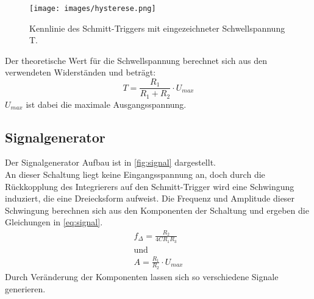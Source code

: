 \begin{figure}[H]
    \centering
    \texttt{[image: images/hysterese.png]}
    \caption{Kennlinie des Schmitt-Triggers mit eingezeichneter Schwellspannung T.\cite{schmitt}}
    \label{fig:hysterese}
\end{figure}

Der theoretische Wert für die Schwellspannung berechnet sich aus den verwendeten Widerständen und beträgt:
\begin{equation}
    T = \frac{R_1}{R_1 + R_2}\cdot U_{max}
    \label{eq:schmitt}
\end{equation}
$U_{max}$ ist dabei die maximale Ausgangsspannung.

\subsection{Signalgenerator}
Der Signalgenerator Aufbau ist in \autoref{fig:signal} dargestellt.\\
An dieser Schaltung liegt keine Eingangsspannung an, doch durch die Rückkopplung des Integrierers auf den Schmitt-Trigger wird eine Schwingung induziert, die eine Dreiecksform aufweist.
Die Frequenz und Amplitude dieser Schwingung berechnen sich aus den Komponenten der Schaltung und ergeben die Gleichungen in \ref{eq:signal}.
\begin{equation}
    \begin{aligned}
        f_{\Delta} = \frac{R_2}{4CR_1R_3}\\
        \text{und}\\
        A = \frac{R_1}{R_2}\cdot U_{max}
    \end{aligned}
    \label{eq:signal}
\end{equation}
Durch Veränderung der Komponenten lassen sich so verschiedene Signale generieren.